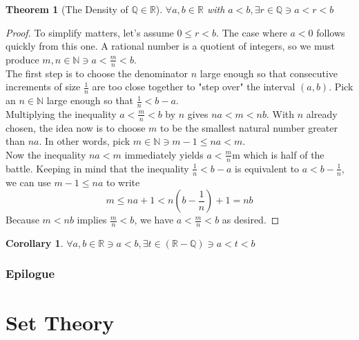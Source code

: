\documentclass[10pt]{report}
\newtheorem{thm2}{Theorem}[section]
\newtheorem{cor2}{Corollary}[section]
\begin{document}
\begin{thm2}[The Density of $\mathbb{Q}\in\mathbb{R}$]
$\forall a,b\in\mathbb{R}$ with $a<b, \exists r\in\mathbb{Q}\ni a<r<b$
\end{thm2}
\begin{proof}
To simplify matters, let's assume $0\leq r< b$. The case where $a<0$ follows quickly from this one. A rational number is a quotient of integers, so we must produce $m,n\in\mathbb{N}\ni a<\frac{m}{n}<b$.\\
The first step is to choose the denominator $n$ large enough so that consecutive increments of size $\frac{1}{n}$ are too close together to "step over" the interval $(a,b)$. Pick an $n\in\mathbb{N}$ large enough so that $\frac{1}{n}<b-a$.\\
Multiplying the inequality $a<\frac{m}{n}<b$ by $n$ gives $na<m<nb$. With $n$ already chosen, the idea now is to choose $m$ to be the smallest natural number greater than $na$. In other words, pick $m\in\mathbb{N}\ni m-1\leq na<m$.\\
Now the inequality $na<m$ immediately yields $a<\frac{m}{n}$m which is half of the battle. Keeping in mind that the inequality $\frac{1}{n} < b-a$ is equivalent to $a<b-\frac{1}{n}$, we can use $m-1\leq na$ to write
$$m\leq na+1 < n\left( b-\frac{1}{n}\right) + 1 = nb$$
Because $m<nb$ implies $\frac{m}{n}<b$, we have $a<\frac{m}{n}<b$ as desired.
\end{proof}
\begin{cor2}
$\forall a,b\in\mathbb{R}\ni a<b, \exists t\in (\mathbb{R}-\mathbb{Q})\ni a<t<b$
\end{cor2}

\section{Epilogue}
\part{Set Theory}
\end{document}
